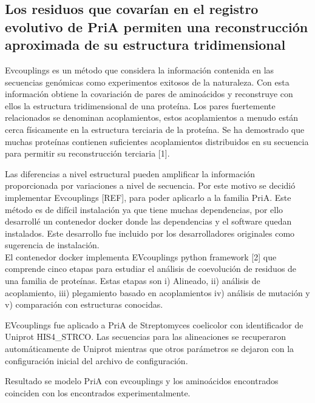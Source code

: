 \documentclass[12pt,twoside]{reedthesis}
\begin{document}
  \subsection{Los residuos que covarían en el registro evolutivo de PriA
  permiten una reconstrucción aproximada de su estructura
  tridimensional}\label{los-residuos-que-covarian-en-el-registro-evolutivo-de-pria-permiten-una-reconstruccion-aproximada-de-su-estructura-tridimensional}
  
  Evcouplings es un método que considera la información contenida en las
  secuencias genómicas como experimentos exitosos de la naturaleza. Con
  esta información obtiene la covariación de pares de aminoácidos y
  reconstruye con ellos la estructura tridimensional de una proteína. Los
  pares fuertemente relacionados se denominan acoplamientos, estos
  acoplamientos a menudo están cerca físicamente en la estructura
  terciaria de la proteína. Se ha demostrado que muchas proteínas
  contienen suficientes acoplamientos distribuidos en su secuencia para
  permitir su reconstrucción terciaria {[}1{]}.
  
  Las diferencias a nivel estructural pueden amplificar la información
  proporcionada por variaciones a nivel de secuencia. Por este motivo se
  decidió implementar Evcouplings {[}REF{]}, para poder aplicarlo a la
  familia PriA. Este método es de difícil instalación ya que tiene muchas
  dependencias, por ello desarrollé un contenedor docker donde las
  dependencias y el software quedan instalados. Este desarrollo fue
  incluido por los desarrolladores originales como sugerencia de
  instalación.\\
  El contenedor docker implementa EVcouplings python framework {[}2{]} que
  comprende cinco etapas para estudiar el análisis de coevolución de
  residuos de una familia de proteínas. Estas etapas son i) Alineado, ii)
  análisis de acoplamiento, iii) plegamiento basado en acoplamientos iv)
  análisis de mutación y v) comparación con estructuras conocidas.
  
  EVcouplings fue aplicado a PriA de Streptomyces coelicolor con
  identificador de Uniprot HIS4\_STRCO. Las secuencias para las
  alineaciones se recuperaron automáticamente de Uniprot mientras que
  otros parámetros se dejaron con la configuración inicial del archivo de
  configuración.
  
  Resultado se modelo PriA con evcouplings y los aminoácidos encontrados
  coinciden con los encontrados experimentalmente.
  
\end{document}
